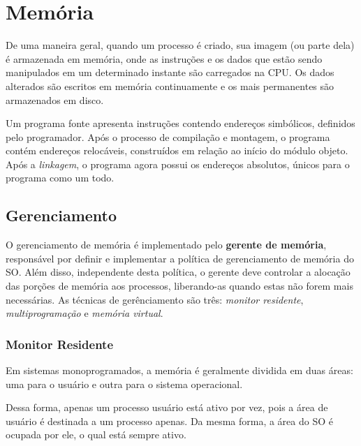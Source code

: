 \chapter{Memória}
De uma maneira geral, quando um processo é criado, sua imagem (ou parte dela) é armazenada em memória, onde as instruções e os dados que estão sendo manipulados em um determinado instante são carregados na CPU. Os dados alterados são escritos em memória continuamente e os mais permanentes são armazenados em disco.

Um programa fonte apresenta instruções contendo endereços simbólicos, definidos pelo programador. Após o processo de compilação e montagem, o programa contém endereços relocáveis, construídos em relação ao início do módulo objeto. Após a \textit{linkagem}, o programa agora possui os endereços absolutos, únicos para o programa como um todo.

















\section{Gerenciamento}
O gerenciamento de memória é implementado pelo \textbf{gerente de memória}, responsável por definir e implementar a política de gerenciamento de memória do SO. Além disso, independente desta política, o gerente deve controlar a alocação das porções de memória aos processos, liberando-as quando estas não forem mais necessárias. As técnicas de gerênciamento são três: \textit{monitor residente}, \textit{multiprogramação} e \textit{memória virtual}.






\subsection{Monitor Residente}
Em sistemas monoprogramados, a memória é geralmente dividida em duas áreas: uma para o usuário e outra para o sistema operacional.

Dessa forma, apenas um processo usuário está ativo por vez, pois a área de usuário é destinada a um processo apenas. Da mesma forma, a área do SO é ocupada por ele, o qual está sempre ativo.

